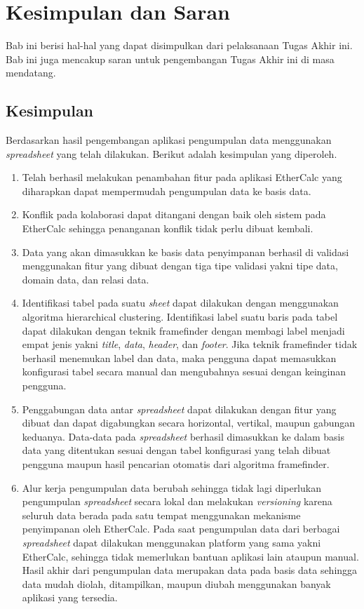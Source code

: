 \chapter{Kesimpulan dan Saran}
Bab ini berisi hal-hal yang dapat disimpulkan dari pelaksanaan Tugas Akhir ini. Bab ini juga mencakup saran untuk pengembangan Tugas Akhir ini di masa mendatang.

\section{Kesimpulan}
Berdasarkan hasil pengembangan aplikasi pengumpulan data menggunakan \textit{spreadsheet} yang telah dilakukan. Berikut adalah kesimpulan yang diperoleh.
\begin{enumerate}
	\item Telah berhasil melakukan penambahan fitur pada aplikasi EtherCalc yang diharapkan dapat mempermudah pengumpulan data ke basis data.
	\item Konflik pada kolaborasi dapat ditangani dengan baik oleh sistem pada EtherCalc sehingga penanganan konflik tidak perlu dibuat kembali.
	\item Data yang akan dimasukkan ke basis data penyimpanan berhasil di validasi menggunakan fitur yang dibuat dengan tiga tipe validasi yakni tipe data, domain data, dan relasi data.
	\item Identifikasi tabel pada suatu \textit{sheet} dapat dilakukan dengan menggunakan algoritma hierarchical clustering. Identifikasi label suatu baris pada tabel dapat dilakukan dengan teknik framefinder dengan membagi label menjadi empat jenis yakni \textit{title}, \textit{data}, \textit{header}, dan \textit{footer}. Jika teknik framefinder tidak berhasil menemukan label dan data, maka pengguna dapat memasukkan konfigurasi tabel secara manual dan mengubahnya sesuai dengan keinginan pengguna. 
	\item Penggabungan data antar \textit{spreadsheet} dapat dilakukan dengan fitur yang dibuat dan dapat digabungkan secara horizontal, vertikal, maupun gabungan keduanya. Data-data pada \textit{spreadsheet} berhasil dimasukkan ke dalam basis data yang ditentukan sesuai dengan tabel konfigurasi yang telah dibuat pengguna maupun hasil pencarian otomatis dari algoritma framefinder.
	\item Alur kerja pengumpulan data berubah sehingga tidak lagi diperlukan pengumpulan \textit{spreadsheet} secara lokal dan melakukan \textit{versioning} karena seluruh data berada pada satu tempat menggunakan mekanisme penyimpanan oleh EtherCalc. Pada saat pengumpulan data dari berbagai \textit{spreadsheet} dapat dilakukan menggunakan platform yang sama yakni EtherCalc, sehingga tidak memerlukan bantuan aplikasi lain ataupun manual. Hasil akhir dari pengumpulan data merupakan data pada basis data sehingga data mudah diolah, ditampilkan, maupun diubah menggunakan banyak aplikasi yang tersedia.
\end{enumerate}

